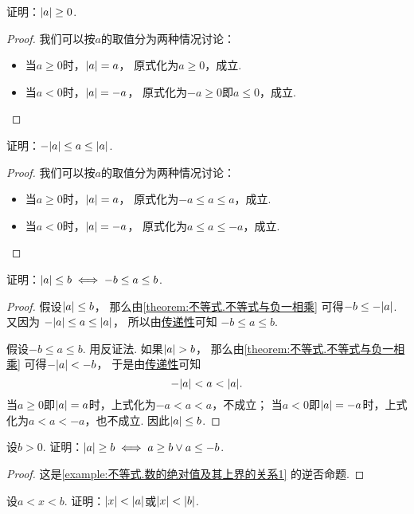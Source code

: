 \begin{example}
证明：\(\abs{a} \geq 0\).
\begin{proof}
我们可以按\(a\)的取值分为两种情况讨论：
\begin{itemize}
	\item 当\(a \geq 0\)时，\(\abs{a}=a\)，
	原式化为\(a \geq 0\)，成立.
	\item 当\(a < 0\)时，\(\abs{a}=-a\)，
	原式化为\(-a \geq 0\)即\(a \leq 0\)，成立.
	\qedhere
\end{itemize}
\end{proof}
\end{example}
\begin{example}\label{example:不等式.数及其绝对值的序}
证明：\(-\abs{a} \leq a \leq \abs{a}\).
\begin{proof}
我们可以按\(a\)的取值分为两种情况讨论：
\begin{itemize}
	\item 当\(a \geq 0\)时，\(\abs{a}=a\)，
	原式化为\(-a \leq a \leq a\)，成立.
	\item 当\(a < 0\)时，\(\abs{a}=-a\)，
	原式化为\(a \leq a \leq -a\)，成立.
	\qedhere
\end{itemize}
\end{proof}
\end{example}
\begin{example}\label{example:不等式.数的绝对值及其上界的关系1}
证明：\(\abs{a} \leq b
\iff
-b \leq a \leq b\).
\begin{proof}
假设\(\abs{a} \leq b\)，
那么由\cref{theorem:不等式.不等式与负一相乘}
可得\(-b \leq -\abs{a}\).
又因为 \hyperref[example:不等式.数及其绝对值的序]{\(-\abs{a} \leq a \leq \abs{a}\)}，
所以由\hyperref[theorem:不等式.不等式的对称性和传递性]{传递性}可知
\(-b \leq a \leq b\).

假设\(-b \leq a \leq b\).
用反证法.
如果\(\abs{a} > b\)，
那么由\cref{theorem:不等式.不等式与负一相乘}
可得\(-\abs{a} < -b\)，
于是由\hyperref[theorem:不等式.不等式的对称性和传递性]{传递性}可知\begin{equation*}
	-\abs{a} < a < \abs{a}.
\end{equation*}
当\(a\geq0\)即\(\abs{a} = a\)时，上式化为\(-a < a < a\)，不成立；
当\(a<0\)即\(\abs{a} = -a\)时，上式化为\(a < a < -a\)，也不成立.
因此\(\abs{a} \leq b\).
\end{proof}
\end{example}
\begin{example}\label{example:不等式.数的绝对值及其上界的关系2}
设\(b>0\).
证明：\(\abs{a} \geq b
\iff
a \geq b \lor a \leq -b\).
\begin{proof}
这是\cref{example:不等式.数的绝对值及其上界的关系1} 的逆否命题.
\end{proof}
\end{example}
\begin{example}\label{example:不等式.数的上下界}
设\(a < x < b\).
证明：\(\abs{x} < \abs{a}\)或\(\abs{x} < \abs{b}\).
\end{example}
